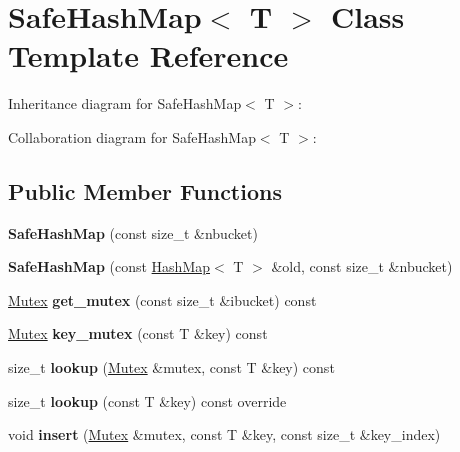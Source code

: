 \hypertarget{classSafeHashMap}{}\section{Safe\+Hash\+Map$<$ T $>$ Class Template Reference}
\label{classSafeHashMap}


Inheritance diagram for Safe\+Hash\+Map$<$ T $>$\+:


Collaboration diagram for Safe\+Hash\+Map$<$ T $>$\+:
\subsection*{Public Member Functions}
\begin{DoxyCompactItemize}
\item 
{\bfseries Safe\+Hash\+Map} (const size\+\_\+t \&nbucket)\hypertarget{classSafeHashMap_a495f302cfbdd81566cfc9a8c5f7d8a98}{}\label{classSafeHashMap_a495f302cfbdd81566cfc9a8c5f7d8a98}

\item 
{\bfseries Safe\+Hash\+Map} (const \hyperlink{classHashMap}{Hash\+Map}$<$ T $>$ \&old, const size\+\_\+t \&nbucket)\hypertarget{classSafeHashMap_af9ebb989c318b4bb9dea8aaf2b03e6a6}{}\label{classSafeHashMap_af9ebb989c318b4bb9dea8aaf2b03e6a6}

\item 
\hyperlink{classMutex}{Mutex} {\bfseries get\+\_\+mutex} (const size\+\_\+t \&ibucket) const \hypertarget{classSafeHashMap_a8662146dbaf25f047544a90efedfadb0}{}\label{classSafeHashMap_a8662146dbaf25f047544a90efedfadb0}

\item 
\hyperlink{classMutex}{Mutex} {\bfseries key\+\_\+mutex} (const T \&key) const \hypertarget{classSafeHashMap_a43f3929696652e2073c903a4182ddfa7}{}\label{classSafeHashMap_a43f3929696652e2073c903a4182ddfa7}

\item 
size\+\_\+t {\bfseries lookup} (\hyperlink{classMutex}{Mutex} \&mutex, const T \&key) const \hypertarget{classSafeHashMap_a85d03b86b12807d939a4f99a5451403f}{}\label{classSafeHashMap_a85d03b86b12807d939a4f99a5451403f}

\item 
size\+\_\+t {\bfseries lookup} (const T \&key) const override\hypertarget{classSafeHashMap_a90e15cc1085a1cea651db42e393da55f}{}\label{classSafeHashMap_a90e15cc1085a1cea651db42e393da55f}

\item 
void {\bfseries insert} (\hyperlink{classMutex}{Mutex} \&mutex, const T \&key, const size\+\_\+t \&key\+\_\+index)\hypertarget{classSafeHashMap_a87f3674c29490f34023e427f84811974}{}\label{classSafeHashMap_a87f3674c29490f34023e427f84811974}


\end{DoxyCompactItemize}
